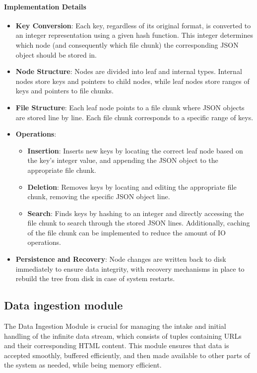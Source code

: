 \paragraph{Implementation Details}
\begin{itemize}
    \item \textbf{Key Conversion}: Each key, regardless of its original format, is converted to an integer representation using a given hash function. This integer determines which node (and consequently which file chunk) the corresponding JSON object should be stored in.
    \item \textbf{Node Structure}: Nodes are divided into leaf and internal types. Internal nodes store keys and pointers to child nodes, while leaf nodes store ranges of keys and pointers to file chunks.
    \item \textbf{File Structure}: Each leaf node points to a file chunk where JSON objects are stored line by line. Each file chunk corresponds to a specific range of keys.
    \item \textbf{Operations}:
    \begin{itemize}
        \item \textbf{Insertion}: Inserts new keys by locating the correct leaf node based on the key's integer value, and appending the JSON object to the appropriate file chunk.
        \item \textbf{Deletion}: Removes keys by locating and editing the appropriate file chunk, removing the specific JSON object line.
        \item \textbf{Search}: Finds keys by hashing to an integer and directly accessing the file chunk to search through the stored JSON lines. Additionally, caching of the file chunk can be implemented to reduce the amount of IO operations.
    \end{itemize}
    \item \textbf{Persistence and Recovery}: Node changes are written back to disk immediately to ensure data integrity, with recovery mechanisms in place to rebuild the tree from disk in case of system restarts.
\end{itemize}


\subsection{Data ingestion module}
The Data Ingestion Module is crucial for managing the intake and initial handling of the infinite data stream, which consists of tuples containing URLs and their corresponding HTML content. This module ensures that data is accepted smoothly, buffered efficiently, and then made available to other parts of the system as needed, while being memory efficient.


